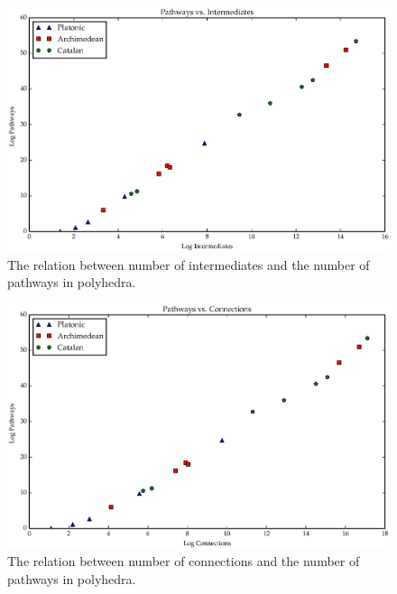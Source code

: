 \begin{figure}[ht]
\centering
\includegraphics[scale=0.6, angle=0]{images/polys_int_path.eps}
\caption{The relation between number of intermediates and the number of pathways in polyhedra.}
\label{fig:IntPath}
\end{figure}

\begin{figure}[ht]
\centering
\includegraphics[scale=0.6, angle=0]{images/polys_con_path.eps}
\caption{The relation between number of connections and the number of pathways in polyhedra.}
\label{fig:ConPath}
\end{figure}




